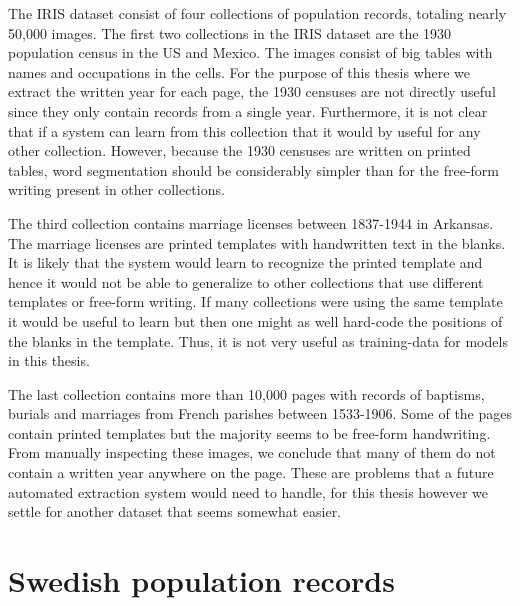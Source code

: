 The IRIS dataset consist of four collections of population records, totaling nearly 50,000 images.
The first two collections in the IRIS dataset are the 1930 population census in the US and Mexico. The images consist of big tables with names and occupations in the cells.
For the purpose of this thesis where we extract the written year for each page, the 1930 censuses are not directly useful since they only contain records from a single year. Furthermore, it is not clear that if a system can learn from this collection that it would by useful for any other collection.
However, because the 1930 censuses are written on printed tables, word segmentation should be considerably simpler than for the free-form writing present in other collections.

The third collection contains marriage licenses between 1837-1944 in Arkansas. The marriage licenses are printed templates with handwritten text in the blanks.
It is likely that the system would learn to recognize the printed template and hence it would not be able to generalize to other collections that use different templates or free-form writing. If many collections were using the same template it would be useful to learn but then one might as well hard-code the positions of the blanks in the template. Thus, it is not very useful as training-data for models in this thesis.

The last collection contains more than 10,000 pages with records of baptisms, burials and marriages from French parishes between 1533-1906. Some of the pages contain printed templates but the majority seems to be free-form handwriting.
From manually inspecting these images, we conclude that many of them do not contain a written year anywhere on the page. These are problems that a future automated extraction system would need to handle, for this thesis however we settle for another dataset that seems somewhat easier.


\section{Swedish population records}

